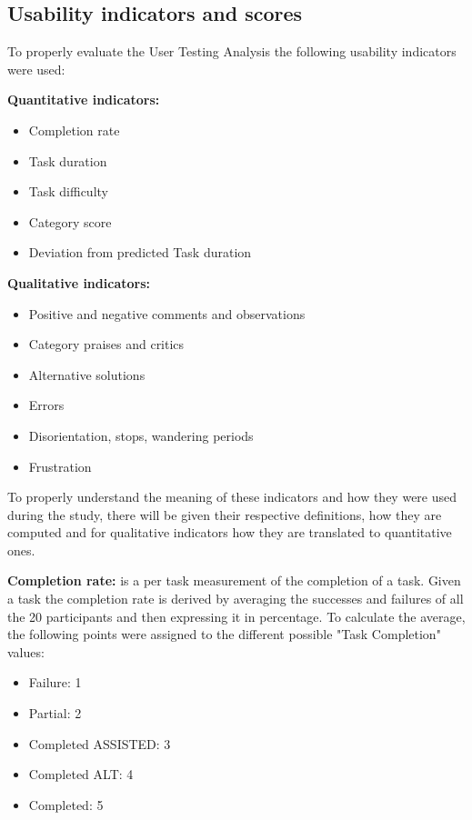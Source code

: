 
\subsection{Usability indicators and scores}
To properly evaluate the User Testing Analysis the following usability indicators were used:\\

\vspace{0.05cm}

\noindent\textbf{Quantitative indicators:}
\begin{itemize}
	\item Completion rate
	\item Task duration
	\item Task difficulty
	\item Category score
	\item Deviation from predicted Task duration
\end{itemize}

\noindent\textbf{Qualitative indicators:}
\begin{itemize}
	\item Positive and negative comments and observations
	\item Category praises and critics
	\item Alternative solutions
	\item Errors
	\item Disorientation, stops, wandering periods
	\item Frustration
\end{itemize}

\vspace{0.5cm}

To properly understand the meaning of these indicators and how they were used during the study, there will be given their respective definitions, how they are computed and for qualitative indicators how they are translated to quantitative ones.

\vspace{0.25cm}

\textbf{Completion rate:} is a per task measurement of the completion of a task. Given a task the completion rate is derived by averaging the successes and failures of all the 20 participants and then expressing it in percentage. To calculate the average, the following points were assigned to the different possible "Task Completion" values:
\begin{itemize}
	\item Failure: 1
	\item Partial: 2
	\item Completed ASSISTED: 3
	\item Completed ALT: 4
	\item Completed: 5
\end{itemize}


